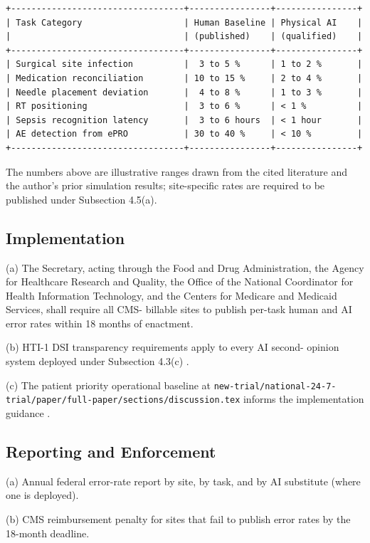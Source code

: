 \begin{verbatim}
+----------------------------------+----------------+----------------+
| Task Category                    | Human Baseline | Physical AI    |
|                                  | (published)    | (qualified)    |
+----------------------------------+----------------+----------------+
| Surgical site infection          |  3 to 5 %      | 1 to 2 %       |
| Medication reconciliation        | 10 to 15 %     | 2 to 4 %       |
| Needle placement deviation       |  4 to 8 %      | 1 to 3 %       |
| RT positioning                   |  3 to 6 %      | < 1 %          |
| Sepsis recognition latency       |  3 to 6 hours  | < 1 hour       |
| AE detection from ePRO           | 30 to 40 %     | < 10 %         |
+----------------------------------+----------------+----------------+
\end{verbatim}

The numbers above are illustrative ranges drawn from the cited
literature and the author's prior simulation results; site-specific
rates are required to be published under Subsection 4.5(a).

\subsection{Implementation}

(a) The Secretary, acting through the Food and Drug Administration,
the Agency for Healthcare Research and Quality, the Office of the
National Coordinator for Health Information Technology, and the
Centers for Medicare and Medicaid Services, shall require all CMS-
billable sites to publish per-task human and AI error rates within
18 months of enactment.

(b) HTI-1 DSI transparency requirements apply to every AI second-
opinion system deployed under Subsection 4.3(c)
\cite{hti1_dsi_fact_sheet_2023}.

(c) The patient priority operational baseline at
\texttt{new-trial/national-24-7-trial/paper/full-paper/sections/discussion.tex}
informs the implementation guidance \cite{kawchak_2026_19994945}.

\subsection{Reporting and Enforcement}

(a) Annual federal error-rate report by site, by task, and by AI
substitute (where one is deployed).

(b) CMS reimbursement penalty for sites that fail to publish error
rates by the 18-month deadline.

